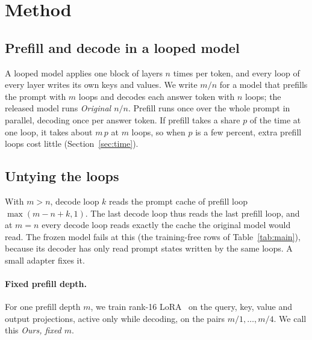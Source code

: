\documentclass[11pt]{article}
\begin{document}
\section{Method}
\label{sec:method}

\subsection{Prefill and decode in a looped model}

A looped model applies one block of layers $n$ times per token, and every loop of every layer writes its own keys and
values. We write $m/n$ for a model that prefills the prompt with $m$ loops and decodes each answer token with $n$
loops; the released model runs \emph{Original $n/n$}. Prefill runs once over the whole prompt in parallel, decoding
once per answer token. If prefill takes a share $p$ of the time at one loop, it takes about $m\,p$ at $m$ loops, so
when $p$ is a few percent, extra prefill loops cost little (Section~\ref{sec:time}).

\subsection{Untying the loops}

With $m>n$, decode loop $k$ reads the prompt cache of prefill loop $\max(m-n+k,1)$. The last decode loop thus reads the
last prefill loop, and at $m=n$ every decode loop reads exactly the cache the original model would read. The frozen model
fails at this (the training-free rows of Table~\ref{tab:main}), because its decoder has only read prompt states
written by the same loops. A small adapter fixes it.

\paragraph{Fixed prefill depth.} For one prefill depth $m$, we train rank-16 LoRA~\citep{lora} on the query, key,
value and output projections, active only while decoding, on the pairs $m/1,\dots,m/4$. We call this \emph{Ours,
fixed $m$}.
\end{document}
